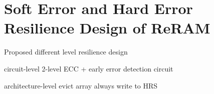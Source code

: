 \section{Soft Error and Hard Error Resilience Design of ReRAM} \label{sec:arch}

Proposed different level resilience design

circuit-level
2-level ECC + early error detection circuit

architecture-level
evict array
always write to HRS

